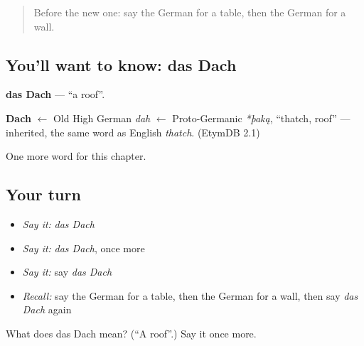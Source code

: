 \begin{quote}
Before the new one: say the German for a table, then the German for a wall.
\end{quote}

\subsection*{You'll want to know: das Dach}
\textbf{das Dach} — \textquotedblleft{}a roof\textquotedblright{}.

\begin{cousinweb}
\textbf{Dach} $\leftarrow$ Old High German \emph{dah} $\leftarrow$ Proto-Germanic \emph{*þaką}, \textquotedblleft{}thatch, roof\textquotedblright{} — inherited, the same word as English \emph{thatch}. (EtymDB 2.1)
\end{cousinweb}

\begin{grammarlens}[title={What you've built}]
One more word for this chapter.
\end{grammarlens}

\subsection*{Your turn}
\begin{itemize}
\raggedright
  \item \emph{Say it:} \emph{das Dach}
  \item \emph{Say it:} \emph{das Dach}, once more
  \item \emph{Say it:} say \emph{das Dach}
  \item \emph{Recall:} say the German for a table, then the German for a wall, then say \emph{das Dach} again
\end{itemize}

\begin{tcolorbox}[breakable,colback=teal!4,colframe=teal!35!black,title={Before you move on}]
What does das Dach mean? (\textquotedblleft{}A roof\textquotedblright{}.) Say it once more.
\end{tcolorbox}
